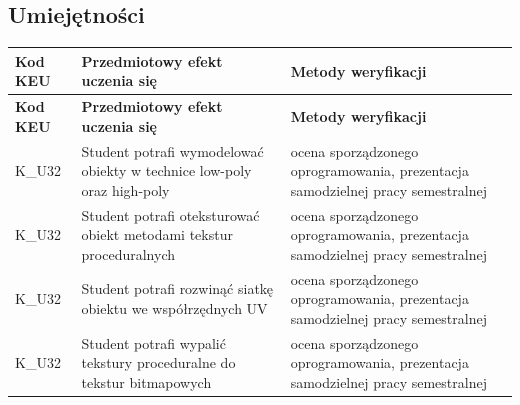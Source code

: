 \documentclass[12pt, a4paper]{article}
\newcommand{\thdrule}{\noalign{\global\setlength{\extrarowheight}{0pt}}}
\newcommand{\thdend}{\noalign{\global\setlength{\extrarowheight}{3pt}}}
\begin{document}
\subsection*{Umiejętności}
{\scriptsize
\begin{longtable}{m{1.6cm}m{9.0cm}m{4.2cm}}
\thdrule\toprule
\rowcolor{pjatkRed} {\color{white}\footnotesize\textbf{\vphantom{Ag}Kod KEU}} & {\color{white}\footnotesize\textbf{\vphantom{Ag}Przedmiotowy efekt uczenia się}} & {\color{white}\footnotesize\textbf{\vphantom{Ag}Metody weryfikacji}} \\
\midrule\thdend
\endfirsthead
\thdrule\toprule
\rowcolor{pjatkRed} {\color{white}\footnotesize\textbf{\vphantom{Ag}Kod KEU}} & {\color{white}\footnotesize\textbf{\vphantom{Ag}Przedmiotowy efekt uczenia się}} & {\color{white}\footnotesize\textbf{\vphantom{Ag}Metody weryfikacji}} \\
\midrule\thdend
\endhead
  \rowcolor{tableRowLight} K\_U32 & Student potrafi wymodelować obiekty w technice low-poly oraz high-poly & ocena sporządzonego oprogramowania, prezentacja samodzielnej pracy semestralnej \\
  \rowcolor{tableRowAlt} K\_U32 & Student potrafi oteksturować obiekt metodami tekstur proceduralnych & ocena sporządzonego oprogramowania, prezentacja samodzielnej pracy semestralnej \\
  \rowcolor{tableRowLight} K\_U32 & Student potrafi rozwinąć siatkę obiektu we współrzędnych UV & ocena sporządzonego oprogramowania, prezentacja samodzielnej pracy semestralnej \\
  \rowcolor{tableRowAlt} K\_U32 & Student potrafi wypalić tekstury proceduralne do tekstur bitmapowych & ocena sporządzonego oprogramowania, prezentacja samodzielnej pracy semestralnej \\
\bottomrule
\end{longtable}}
\end{document}
